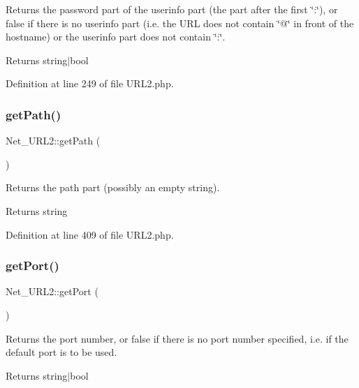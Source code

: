 Returns the password part of the userinfo part (the part after the first \char`\"{}\+:\char`\"{}), or false if there is no userinfo part (i.\+e. the U\+RL does not contain \char`\"{}@\char`\"{} in front of the hostname) or the userinfo part does not contain \char`\"{}\+:\char`\"{}.

\begin{DoxyReturn}{Returns}
string$\vert$bool 
\end{DoxyReturn}


Definition at line 249 of file U\+R\+L2.\+php.

\hypertarget{classNet__URL2_a1c14da4e4da398c69ab0efcc80b183d2}{}\label{classNet__URL2_a1c14da4e4da398c69ab0efcc80b183d2} 
\subsubsection{\texorpdfstring{get\+Path()}{getPath()}}
{\footnotesize\ttfamily Net\+\_\+\+U\+R\+L2\+::get\+Path (\begin{DoxyParamCaption}{ }\end{DoxyParamCaption})}

Returns the path part (possibly an empty string).

\begin{DoxyReturn}{Returns}
string 
\end{DoxyReturn}


Definition at line 409 of file U\+R\+L2.\+php.

\hypertarget{classNet__URL2_a3684482beddce2747c3ef0cb5c3e9c64}{}\label{classNet__URL2_a3684482beddce2747c3ef0cb5c3e9c64} 
\subsubsection{\texorpdfstring{get\+Port()}{getPort()}}
{\footnotesize\ttfamily Net\+\_\+\+U\+R\+L2\+::get\+Port (\begin{DoxyParamCaption}{ }\end{DoxyParamCaption})}

Returns the port number, or false if there is no port number specified, i.\+e. if the default port is to be used.

\begin{DoxyReturn}{Returns}
string$\vert$bool 
\end{DoxyReturn}


